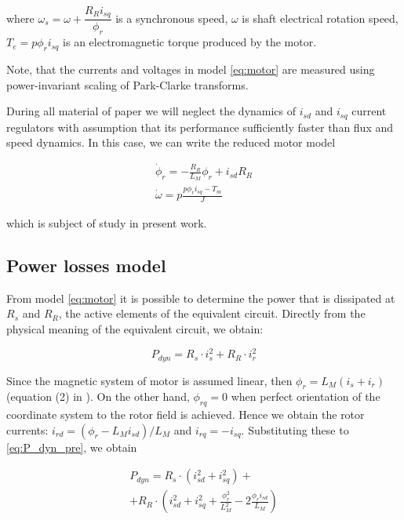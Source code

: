 \documentclass[journal]{IEEEtran}
\begin{document}
where $\omega_s = \omega + \dfrac{R_R i_{sq}}{\phi_r}$ is a synchronous speed, $\omega$ is shaft electrical rotation speed, $T_e = p \phi_r i_{sq}$ is an electromagnetic torque produced by the motor.

Note, that the currents and voltages in model \eqref{eq:motor} are measured using power-invariant scaling of Park-Clarke transforms.

During all material of paper we will neglect the dynamics of $i_{sd}$ and $i_{sq}$ current regulators with assumption that its performance sufficiently faster than flux and speed dynamics. In this case, we can write the reduced motor model

\begin{equation}\label{eq:motor_reduced}
\begin{gathered}
\dot \phi_r = -\frac{R_R}{L_M} \phi_r  + i_{sd} R_R \\  
\dot \omega = p\frac{p \phi_r i_{sq} - T_m}{ J }
\end{gathered}
\end{equation}

which is subject of study in present work.

\subsection{Power losses model}

From model \eqref{eq:motor} it is possible to determine the power that is dissipated at $R_s$ and $R_R$, the active elements of the equivalent circuit. Directly from the physical meaning of the equivalent circuit, we obtain:

\begin{equation}\label{eq:P_dyn_pre}
P_{dyn} = R_s \cdot i_s^2 + R_R \cdot i_r^2
\end{equation}

Since the magnetic system of motor is assumed linear, then $\phi_r = L_M (i_s + i_r)$ (equation (2) in \cite{8}). On the other hand, $\phi_{rq} = 0$ when perfect orientation of the coordinate system to the rotor field is achieved. Hence we obtain the rotor currents: $i_{rd} = (\phi_r - L_M i_{sd}) / L_M$ and $i_{rq} = -i_{sq}$. Substituting these to \eqref{eq:P_dyn_pre}, we obtain

\begin{equation}
\begin{gathered}
P_{dyn} = R_s \cdot (i_{sd}^2 + i_{sq}^2) + \\
+ R_R \cdot  \left ( i_{sd}^2 + i_{sq}^2 + \frac{\phi_r^2}{L_M^2} - 2 \frac{\phi_r i_{sd}}{L_M} \right )
\end{gathered}
\end{equation}
\end{document}
